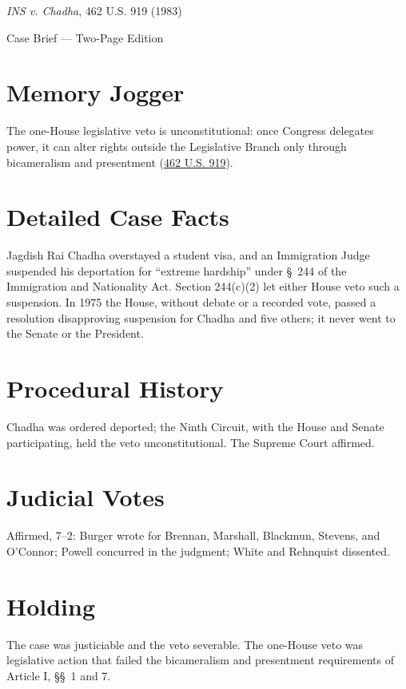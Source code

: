 \documentclass[12pt]{article}
\begin{document}
\begin{center}
{\LARGE \textit{INS v. Chadha}, 462 U.S. 919 (1983)\par}
\vspace{0.5em}
{\large Case Brief --- Two-Page Edition\par}
\end{center}

\section{Memory Jogger}
The one-House legislative veto is unconstitutional: once Congress delegates power, it can alter rights outside the Legislative Branch only through bicameralism and presentment (\href{https://supreme.justia.com/cases/federal/us/462/919/}{462 U.S. 919}).

\section{Detailed Case Facts}
Jagdish Rai Chadha overstayed a student visa, and an Immigration Judge suspended his deportation for ``extreme hardship'' under \S~244 of the Immigration and Nationality Act. Section 244(c)(2) let either House veto such a suspension. In 1975 the House, without debate or a recorded vote, passed a resolution disapproving suspension for Chadha and five others; it never went to the Senate or the President.

\section{Procedural History}
Chadha was ordered deported; the Ninth Circuit, with the House and Senate participating, held the veto unconstitutional. The Supreme Court affirmed.

\section{Judicial Votes}
Affirmed, 7--2: Burger wrote for Brennan, Marshall, Blackmun, Stevens, and O'Connor; Powell concurred in the judgment; White and Rehnquist dissented.

\section{Holding}
The case was justiciable and the veto severable. The one-House veto was legislative action that failed the bicameralism and presentment requirements of Article I, \S\S~1 and 7.
\end{document}
